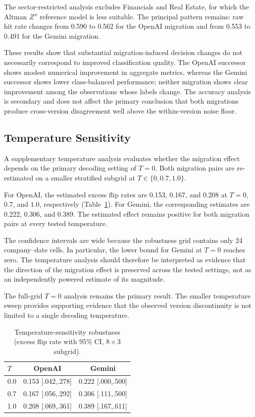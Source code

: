 \documentclass[11pt]{article}
\begin{document}
The sector-restricted analysis excludes Financials and Real Estate, for which the Altman $Z''$ reference model is less suitable. The principal pattern remains: raw hit rate changes from 0.590 to 0.562 for the OpenAI migration and from 0.553 to 0.491 for the Gemini migration.

These results show that substantial migration-induced decision changes do not necessarily correspond to improved classification quality. The OpenAI successor shows modest numerical improvement in aggregate metrics, whereas the Gemini successor shows lower class-balanced performance; neither migration shows clear improvement among the observations whose labels change. The accuracy analysis is secondary and does not affect the primary conclusion that both migrations produce cross-version disagreement well above the within-version noise floor.

\subsection{Temperature Sensitivity}
A supplementary temperature analysis evaluates whether the migration effect depends on the primary decoding setting of $T=0$. Both migration pairs are re-estimated on a smaller stratified subgrid at $T\in\{0,0.7,1.0\}$.

For OpenAI, the estimated excess flip rates are 0.153, 0.167, and 0.208 at $T=0$, $0.7$, and $1.0$, respectively (Table~\ref{tab:temp}). For Gemini, the corresponding estimates are 0.222, 0.306, and 0.389. The estimated effect remains positive for both migration pairs at every tested temperature.

The confidence intervals are wide because the robustness grid contains only 24 company--date cells. In particular, the lower bound for Gemini at $T=0$ reaches zero. The temperature analysis should therefore be interpreted as evidence that the direction of the migration effect is preserved across the tested settings, not as an independently powered estimate of its magnitude.

The full-grid $T=0$ analysis remains the primary result. The smaller temperature sweep provides supporting evidence that the observed version discontinuity is not limited to a single decoding temperature.

\begin{table}[t]
\centering
\caption{Temperature-sensitivity robustness (excess flip rate with 95\% CI, $8\times3$ subgrid).}
\label{tab:temp}
\small
\begin{tabular}{@{}lcc@{}}
\toprule
$T$ & OpenAI & Gemini \\
\midrule
0.0 & 0.153 [.042,.278] & 0.222 [.000,.500] \\
0.7 & 0.167 [.056,.292] & 0.306 [.111,.500] \\
1.0 & 0.208 [.069,.361] & 0.389 [.167,.611] \\
\bottomrule
\end{tabular}
\end{table}
\end{document}

